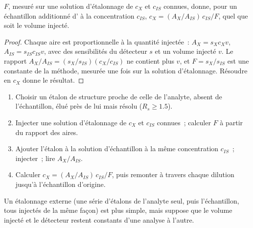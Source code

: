 \begin{proposition}\label{prop:b2:chromatography:internal-standard}
$F$, mesuré sur une solution d'étalonnage de $c_X$ et $c_{IS}$ connues, donne, pour un échantillon
additionné d' à la concentration $c_{IS}$, $c_X = (A_X/A_{IS})\,c_{IS}/F$, quel que soit le
volume injecté.
\end{proposition}

\begin{proof}
Chaque aire est proportionnelle à la quantité injectée~: $A_X = s_X c_X v$, $A_{IS} = s_{IS} c_{IS} v$,
avec des sensibilités du détecteur $s$ et un volume injecté $v$. Le rapport $A_X/A_{IS} = (s_X/s_{IS})(c_X/c_{IS})$
ne contient plus $v$, et $F = s_X/s_{IS}$ est une constante de la méthode, mesurée une fois sur la
solution d'étalonnage. Résoudre en $c_X$ donne le résultat.
\end{proof}

\begin{method}\label{met:b2:chromatography:internal-standard}
\begin{enumerate}
  \item Choisir un étalon de structure proche de celle de l'analyte, absent de l'échantillon, élué près de
        lui mais résolu ($R_s \ge 1.5$).
  \item Injecter une solution d'étalonnage de $c_X$ et $c_{IS}$ connues~; calculer $F$ à partir du rapport des aires.
  \item Ajouter l'étalon à la solution d'échantillon à la même concentration $c_{IS}$~; injecter~; lire $A_X/A_{IS}$.
  \item Calculer $c_X = (A_X/A_{IS})\,c_{IS}/F$, puis remonter à travers chaque dilution jusqu'à
        l'échantillon d'origine.
\end{enumerate}
\end{method}

Un étalonnage externe (une série d'étalons de l'analyte seul, puis l'échantillon, tous injectés de la
même façon) est plus simple, mais suppose que le volume injecté et le détecteur restent constants d'une
analyse à l'autre.

